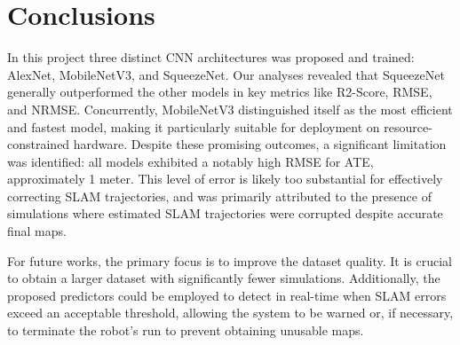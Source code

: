 \section{Conclusions}

In this project three distinct CNN architectures was proposed and trained: AlexNet, MobileNetV3, and SqueezeNet. Our analyses revealed that SqueezeNet generally outperformed the other models in key metrics like R2-Score, RMSE, and NRMSE. Concurrently, MobileNetV3 distinguished itself as the most efficient and fastest model, making it particularly suitable for deployment on resource-constrained hardware. Despite these promising outcomes, a significant limitation was identified: all models exhibited a notably high RMSE for ATE, approximately 1 meter. This level of error is likely too substantial for effectively correcting SLAM trajectories, and was primarily attributed to the presence of  simulations where estimated SLAM trajectories were corrupted despite accurate final maps. 

For future works, the primary focus is to improve the dataset quality. It is crucial to obtain a larger dataset with significantly fewer  simulations. Additionally, the proposed predictors could be employed to detect in real-time when SLAM errors exceed an acceptable threshold, allowing the system to be warned or, if necessary, to terminate the robot's run to prevent obtaining unusable maps.